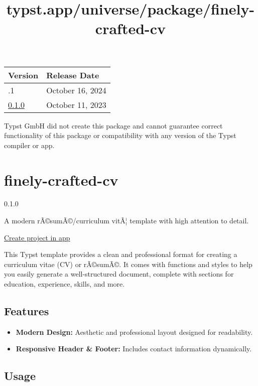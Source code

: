 \begin{longtable}[]{@{}ll@{}}
\toprule\noalign{}
Version & Release Date \\
\midrule\noalign{}
\endhead
\bottomrule\noalign{}
\endlastfoot
0.1.1 & October 16, 2024 \\
\href{https://typst.app/universe/package/fruitify/0.1.0/}{0.1.0} &
October 11, 2023 \\
\end{longtable}

Typst GmbH did not create this package and cannot guarantee correct
functionality of this package or compatibility with any version of the
Typst compiler or app.


\title{typst.app/universe/package/finely-crafted-cv}

\label{banner}
\label{template-thumbnail}

\section{finely-crafted-cv}\label{finely-crafted-cv}

{ 0.1.0 }

A modern rÃ©sumÃ©/curriculum vitÃ¦ template with high attention to
detail.

\href{/app?template=finely-crafted-cv&version=0.1.0}{Create project in
app}

\label{readme}
This Typst template provides a clean and professional format for
creating a curriculum vitae (CV) or rÃ©sumÃ©. It comes with functions
and styles to help you easily generate a well-structured document,
complete with sections for education, experience, skills, and more.

\subsection{Features}\label{features}

\begin{itemize}
\tightlist
\item
  \textbf{Modern Design:} Aesthetic and professional layout designed for
  readability.
\item
  \textbf{Responsive Header \& Footer:} Includes contact information
  dynamically.
\end{itemize}

\subsection{Usage}\label{usage}

